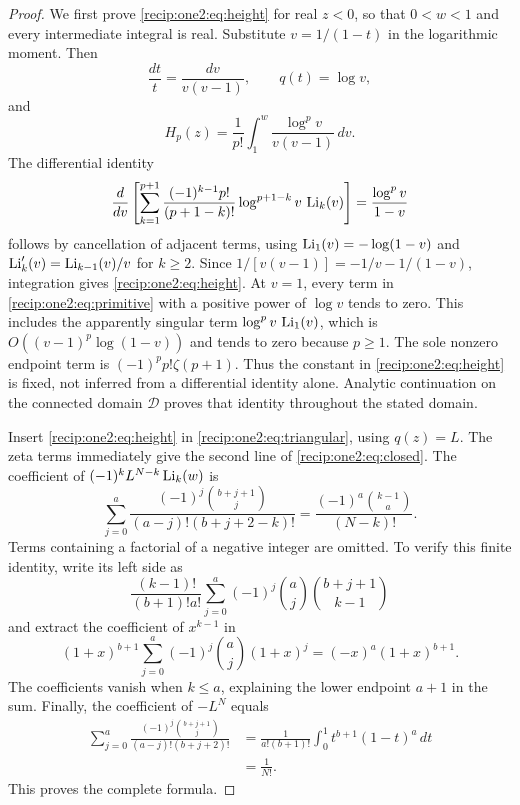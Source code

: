 \begin{proof}
We first prove \eqref{recip:one2:eq:height} for real $z<0$, so that
$0<w<1$ and every intermediate integral is real.  Substitute
$v=1/(1-t)$ in the logarithmic moment.  Then
\[
 \frac{dt}{t}=\frac{dv}{v(v-1)},\qquad q(t)=\log v,
\]
and
\[
 H_p(z)=\frac1{p!}\int_1^w\frac{\log^p v}{v(v-1)}\,dv.
\]
The differential identity
\begin{equation}
 \frac{d}{dv}\left[
 \sum_{k=1}^{p+1}\frac{(-1)^{k-1}p!}{(p+1-k)!}
       \log^{p+1-k}v\,\operatorname{Li}_k(v)\right]
       =\frac{\log^p v}{1-v}
 \label{recip:one2:eq:primitive}
\end{equation}
follows by cancellation of adjacent terms, using
$\operatorname{Li}_1(v)=-\log(1-v)$ and $\operatorname{Li}'_k(v)=\operatorname{Li}_{k-1}(v)/v$ for $k\ge2$.
Since
$1/[v(v-1)]=-1/v-1/(1-v)$, integration gives
\eqref{recip:one2:eq:height}.  At $v=1$, every term in
\eqref{recip:one2:eq:primitive} with a positive power of $\log v$ tends to
zero.  This includes the apparently singular term
$\log^p v\,\operatorname{Li}_1(v)$, which is
$O((v-1)^p\log(1-v))$ and tends to zero because $p\ge1$.
The sole nonzero endpoint term is $(-1)^pp!\zeta(p+1)$.
Thus the constant in \eqref{recip:one2:eq:height} is fixed, not inferred
from a differential identity alone.  Analytic continuation on the
connected domain $\mathcal D$ proves that identity throughout the
stated domain.

Insert \eqref{recip:one2:eq:height} in
\eqref{recip:one2:eq:triangular}, using $q(z)=L$.  The zeta terms immediately
give the second line of \eqref{recip:one2:eq:closed}.  The coefficient of
$(-1)^k L^{N-k}\operatorname{Li}_k(w)$ is
\[
 \sum_{j=0}^a\frac{(-1)^j\binom{b+j+1}{j}}
                    {(a-j)!(b+j+2-k)!}
 =\frac{(-1)^a\binom{k-1}{a}}{(N-k)!}.
\]
Terms containing a factorial of a negative integer are omitted.  To
verify this finite identity, write its left side as
\[
 \frac{(k-1)!}{(b+1)!a!}
 \sum_{j=0}^a(-1)^j\binom aj\binom{b+j+1}{k-1}
\]
and extract the coefficient of $x^{k-1}$ in
\[
 (1+x)^{b+1}\sum_{j=0}^a(-1)^j\binom aj(1+x)^j
   =(-x)^a(1+x)^{b+1}.
\]
The coefficients vanish when $k\le a$, explaining the lower endpoint
$a+1$ in the sum.  Finally, the coefficient of $-L^N$ equals
\begin{align*}
 \sum_{j=0}^a\frac{(-1)^j\binom{b+j+1}{j}}
                    {(a-j)!(b+j+2)!}
 &=\frac1{a!(b+1)!}\int_0^1t^{b+1}(1-t)^a\,dt\\
 &=\frac1{N!}.
\end{align*}
This proves the complete formula.
\end{proof}


